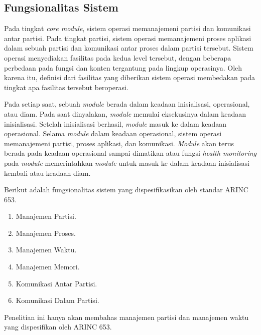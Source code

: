 \subsection{Fungsionalitas Sistem}

Pada tingkat \textit{core module}, sistem operasi memanajemeni partisi dan komunikasi antar
partisi.  Pada tingkat partisi, sistem operasi memanajemeni proses aplikasi dalam sebuah partisi
dan komunikasi antar proses dalam partisi tersebut.  Sistem operasi menyediakan fasilitas pada
kedua level tersebut, dengan beberapa perbedaan pada fungsi dan konten tergantung pada lingkup
operasinya.  Oleh karena itu, definisi dari fasilitas yang diberikan sistem operasi membedakan pada tingkat
apa fasilitas tersebut beroperasi.

Pada setiap saat, sebuah \textit{module} berada dalam keadaan inisialisasi, operasional, atau
diam.  Pada saat dinyalakan, \textit{module} memulai eksekusinya dalam keadaan inisialisasi.
Setelah inisialisasi berhasil, \textit{module} masuk ke dalam keadaan operasional.  Selama
\textit{module} dalam keadaan operasional, sistem operasi memanajemeni partisi, proses aplikasi,
dan komunikasi.  \textit{Module} akan terus berada pada keadaan operasional sampai dimatikan
atau fungsi \textit{health monitoring} pada \textit{module} memerintahkan \textit{module} untuk
masuk ke dalam keadaan inisialisasi kembali atau keadaan diam.

Berikut adalah fungsionalitas sistem yang dispesifikasikan oleh standar ARINC 653.

\begin{enumerate}

    \item Manajemen Partisi.

    \item Manajemen Proses.

    \item Manajemen Waktu.

    \item Manajemen Memori.

    \item Komunikasi Antar Partisi.

    \item Komunikasi Dalam Partisi.

\end{enumerate}

Penelitian ini hanya akan membahas manajemen partisi dan manajemen waktu yang dispesifikan oleh
ARINC 653.

